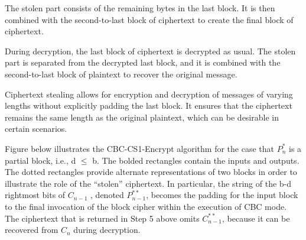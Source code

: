 {	The stolen part consists of the remaining bytes in the last block. It is then combined with the second-to-last block of ciphertext to create the final block of ciphertext.
	
	During decryption, the last block of ciphertext is decrypted as usual. The stolen part is separated from the decrypted last block, and it is combined with the second-to-last block of plaintext to recover the original message.
	
	Ciphertext stealing allows for encryption and decryption of messages of varying lengths without explicitly padding the last block. It ensures that the ciphertext remains the same length as the original plaintext, which can be desirable in certain scenarios.
	
	Figure  below illustrates the CBC-CS1-Encrypt algorithm for the case that $ P_{n}^{*} $ is a partial block, i.e., d $ \le $ b. The bolded rectangles contain the inputs and outputs.
	The dotted rectangles provide alternate representations of two blocks in order to illustrate the role of the “stolen” ciphertext.
	In particular, the string of the b-d rightmost bits of $ C_{n-1} $ , denoted $ P_{n-1}^{**} $, becomes the padding for the input block to the final invocation of the block cipher within the execution of CBC mode. The ciphertext that is returned in Step 5 above omits $ C_{n-1}^{**} $, because it can be recovered from $ C_{n} $ during decryption.
	

	}
	
	\newpage
